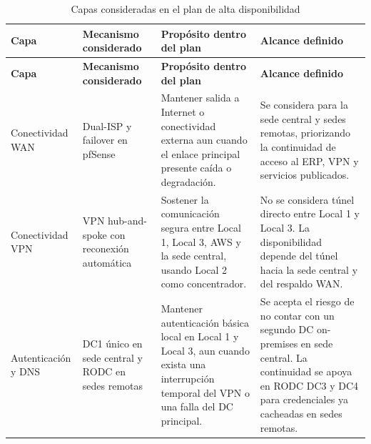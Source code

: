 \documentclass[11pt, a4paper, oneside]{report}
\begin{document}
\begin{xltabular}{\textwidth}{@{}|L{3.1cm}|L{3.4cm}|X|X|@{}}
\caption{Capas consideradas en el plan de alta disponibilidad}
\label{tab:capas_alta_disponibilidad} \\

\parbox[c][1.1cm][c]{\linewidth}{\centering\color{white}\bfseries\small Capa} &
\parbox[c][1.1cm][c]{\linewidth}{\centering\color{white}\bfseries\small Mecanismo considerado} &
\parbox[c][1.1cm][c]{\linewidth}{\centering\color{white}\bfseries\small Propósito dentro del plan} &
\parbox[c][1.1cm][c]{\linewidth}{\centering\color{white}\bfseries\small Alcance definido} \\ \hline
\endfirsthead

\parbox[c][1.1cm][c]{\linewidth}{\centering\color{white}\bfseries\small Capa} &
\parbox[c][1.1cm][c]{\linewidth}{\centering\color{white}\bfseries\small Mecanismo considerado} &
\parbox[c][1.1cm][c]{\linewidth}{\centering\color{white}\bfseries\small Propósito dentro del plan} &
\parbox[c][1.1cm][c]{\linewidth}{\centering\color{white}\bfseries\small Alcance definido} \\ \hline
\endhead

\hline
\endfoot

{\small Conectividad WAN} &
{\small Dual-ISP y failover en pfSense} &
{\small Mantener salida a Internet o conectividad externa aun cuando el enlace principal presente caída o degradación.} &
{\small Se considera para la sede central y sedes remotas, priorizando la continuidad de acceso al ERP, VPN y servicios publicados.} \\ \hline

{\small Conectividad VPN} &
{\small VPN hub-and-spoke con reconexión automática} &
{\small Sostener la comunicación segura entre Local 1, Local 3, AWS y la sede central, usando Local 2 como concentrador.} &
{\small No se considera túnel directo entre Local 1 y Local 3. La disponibilidad depende del túnel hacia la sede central y del respaldo WAN.} \\ \hline

{\small Autenticación y DNS} &
{\small DC1 único en sede central y RODC en sedes remotas} &
{\small Mantener autenticación básica local en Local 1 y Local 3, aun cuando exista una interrupción temporal del VPN o una falla del DC principal.} &
{\small Se acepta el riesgo de no contar con un segundo DC on-premises en sede central. La continuidad se apoya en RODC DC3 y DC4 para credenciales ya cacheadas en sedes remotas.} \\ \hline


\end{xltabular}
\end{document}
